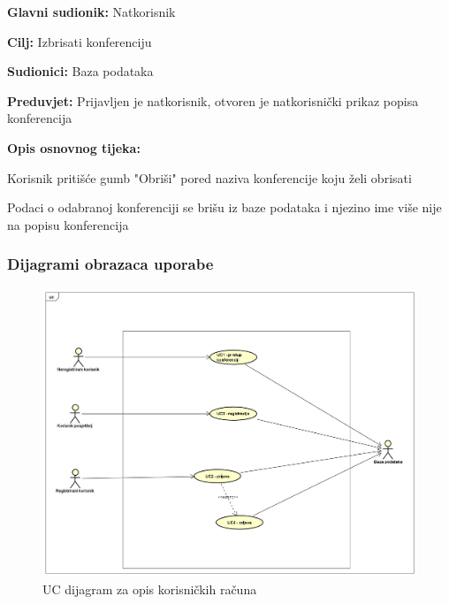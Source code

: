 					\noindent {}
					\begin{packed_item}
						
						\item \textbf{Glavni sudionik: } Natkorisnik
						\item  \textbf{Cilj:} Izbrisati konferenciju
						\item  \textbf{Sudionici:} Baza podataka
						\item  \textbf{Preduvjet:} Prijavljen je natkorisnik, otvoren je natkorisnički prikaz popisa konferencija
						\item  \textbf{Opis osnovnog tijeka:}
						
						\item[] \begin{packed_enum}
							
							\item Korisnik pritišće gumb "Obriši" pored naziva konferencije koju želi obrisati
							\item Podaci o odabranoj konferenciji se brišu iz baze podataka i njezino ime više nije na popisu konferencija
							
						\end{packed_enum}
					\end{packed_item}
				
				\clearpage
				\subsubsection{Dijagrami obrazaca uporabe}
					
					\begin{figure} [hbt!]
						\includegraphics[width=\linewidth]{Slike/UCDiagramUserProfiles.png}
						\caption{UC dijagram za opis korisničkih računa}
					\end{figure}
					
